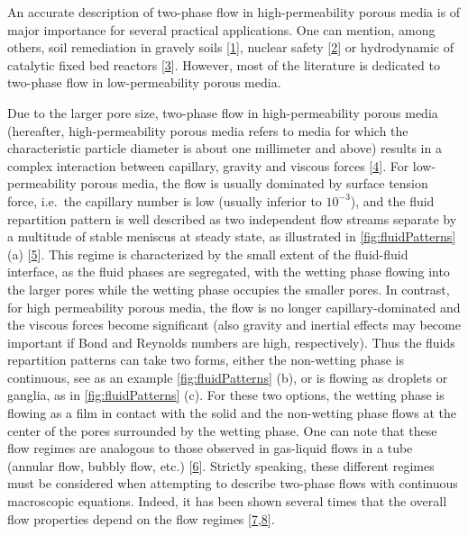 \documentclass[]{article}
\begin{document}
An accurate description of two-phase flow in high-permeability porous
media is of major importance for several practical applications. One can
mention, among others, soil remediation in gravely soils
{[}\protect\hyperlink{ref-fetter2017contaminant}{1}{]}, nuclear safety
{[}\protect\hyperlink{ref-clavier2017modeling}{2}{]} or hydrodynamic of
catalytic fixed bed reactors
{[}\protect\hyperlink{ref-Santos1991}{3}{]}. However, most of the
literature is dedicated to two-phase flow in low-permeability porous
media.

Due to the larger pore size, two-phase flow in high-permeability porous
media (hereafter, high-permeability porous media refers to media for
which the characteristic particle diameter is about one millimeter and
above) results in a complex interaction between capillary, gravity and
viscous forces {[}\protect\hyperlink{ref-davit2018one}{4}{]}. For
low-permeability porous media, the flow is usually dominated by surface
tension force, i.e.~the capillary number is low (usually inferior to
\(10^{-3}\)), and the fluid repartition pattern is well described as two
independent flow streams separate by a multitude of stable meniscus at
steady state, as illustrated in \cref{fig:fluidPatterns} (a)
{[}\protect\hyperlink{ref-dullien2012porous}{5}{]}. This regime is
characterized by the small extent of the fluid-fluid interface, as the
fluid phases are segregated, with the wetting phase flowing into the
larger pores while the wetting phase occupies the smaller pores. In
contrast, for high permeability porous media, the flow is no longer
capillary-dominated and the viscous forces become significant (also
gravity and inertial effects may become important if Bond and Reynolds
numbers are high, respectively). Thus the fluids repartition patterns
can take two forms, either the non-wetting phase is continuous, see as
an example \cref{fig:fluidPatterns} (b), or is flowing as droplets or
ganglia, as in \cref{fig:fluidPatterns} (c). For these two options, the
wetting phase is flowing as a film in contact with the solid and the
non-wetting phase flows at the center of the pores surrounded by the
wetting phase. One can note that these flow regimes are analogous to
those observed in gas-liquid flows in a tube (annular flow, bubbly flow,
etc.) {[}\protect\hyperlink{ref-taitel1976model}{6}{]}. Strictly
speaking, these different regimes must be considered when attempting to
describe two-phase flows with continuous macroscopic equations. Indeed,
it has been shown several times that the overall flow properties depend
on the flow regimes
{[}\protect\hyperlink{ref-Avraam1995a}{7},\protect\hyperlink{ref-armstrong2016beyond}{8}{]}.
\end{document}
